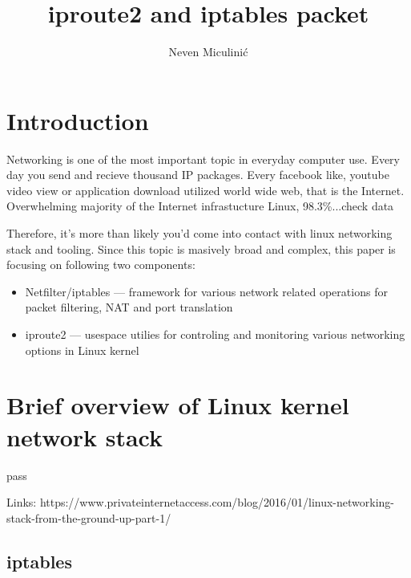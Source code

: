 \documentclass[times, utf8, seminar, english]{fer}
\begin{document}
\theoremstyle{definition}
\newtheorem{definition}{Definition}[section]

\title{iproute2 and iptables packet}
\author{Neven Miculinić}

\maketitle
\tableofcontents

\chapter{Introduction}

Networking is one of the most important topic in everyday computer use. Every day you send and recieve thousand IP packages. 
Every facebook like, youtube video view or application download utilized world wide web, that is the Internet.
Overwhelming majority of the Internet infrastucture Linux, 98.3\%...check data

Therefore, it's more than likely you'd come into contact with linux networking stack and tooling.
Since this topic is masively broad and complex, this paper is focusing on following two components:
\begin{itemize}
    \item Netfilter/iptables --- framework for various network related operations for packet filtering, NAT and port translation
    \item iproute2 --- usespace utilies for controling and monitoring various networking options in Linux kernel
\end{itemize}

\chapter{Brief overview of Linux kernel network stack}
pass

Links:
https://www.privateinternetaccess.com/blog/2016/01/linux-networking-stack-from-the-ground-up-part-1/

\section{iptables}
\\
\end{document}
